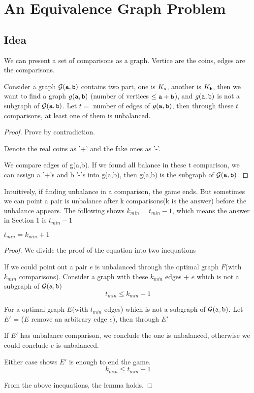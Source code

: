 \section{An Equivalence Graph Problem}


\subsection*{Idea}
We can present a set of comparisons as a graph. Vertice are the coins, edges are the comparisons.

Consider a graph ${\cal G}(\mathtt{a},\mathtt{b})$ contains two part, one is $K_{\mathtt{a}}$, another is $K_{\mathtt{b}}$, then we want to find a graph $g(\mathtt{a},\mathtt{b})$ (number of vertices $\leq \mathtt{a}+\mathtt{b}$), and $g(\mathtt{a},\mathtt{b})$ is not a subgraph of ${\cal G}(\mathtt{a},\mathtt{b})$. 
Let $t =$ number of edges of $g(\mathtt{a},\mathtt{b})$, then through these $t$ comparisons, at least one of them is unbalanced.

\begin{proof}

Prove by contradiction.

Denote the real coins as '+' and the fake ones as '-'. 

We compare edges of g(a,b). If we found all balance in these t comparison, we can assign a '+'s and b '-'s into g(a,b), then g(a,b) is the subgraph of ${\cal G}(\mathtt{a},\mathtt{b})$.
\end{proof}

Intuitively, if finding unbalance in a comparison, the game ends. But sometimes we can point a pair is unbalance after k comparisons(k is the answer) before the unbalance appears. The following shows $k_{min}=t_{min}-1$, which means the answer in Section 1 is $t_{min}-1$

\begin{lemma}
$t_{min} = k_{min}+1 $
\end{lemma}

\begin{proof}
We divide the proof of the equation into two inequations

If we could point out a pair $e$ is unbalanced through the optimal graph $F$(with $k_{min}$ comparisons).
Consider a graph with these $k_{min}$ edges + $e$ which is not a subgraph of ${\cal G}(\mathtt{a},\mathtt{b})$
\[t_{min}\leq k_{min}+1\]

For a optimal graph $E$(with $t_{min}$ edges) which is not a subgraph of ${\cal G}(\mathtt{a},\mathtt{b})$. Let $E'$ = ($E$ remove an arbitrary edge $e$), then through $E'$

If $E'$ has unbalance comparison, we conclude the one is unbalanced, otherwise we could conclude $e$ is unbalanced.

Either case shows $E'$ is enough to end the game.
\[k_{min} \leq t_{min}-1\]

From the above inequations, the lemma holds.

\end{proof}

